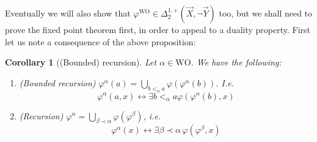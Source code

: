 \documentclass[10pt,a4paper]{amsart}
\theoremstyle{plain}
\newtheorem{corollary}[corollary]{Corollary}
\theoremstyle{definition}
\renewcommand{\phi}{\varphi}
\theoremstyle{plain}
\theoremstyle{definition} %
\newcommand{\liff}{\leftrightarrow}
\newcommand{\Din}[2]{\Delta^{#1}_{#2}}
\newcommand{\posDin}[3]{\Din{#1,+}{#2} (#3)}
\newcommand{\posnegDin}[4]{\posDin{#1}{#2}{#3, \lnot #4}}
\newcommand{\WO}{\mathrm{WO}}
\newcommand{\ordlneq}{\prec}
\begin{document}
Eventually we will also show that $\phi^\WO \in \posnegDin 1 2 {\vec X}{\vec Y}$ too, but we shall need to prove the fixed point theorem first, in order to appeal to a duality property.
First let us note a consequence of the above proposition:
\begin{corollary}
    [(Bounded) recursion]
    \label{cor:(bdd)-recursion}
   Let $\alpha \in \WO$. We have the following:
    \begin{enumerate}
        \item\label{item:bdd-recursion} (Bounded recursion) $\phi^\alpha(a) = \bigcup\limits_{b<_\alpha a} \phi(\phi^\alpha(b))$.
    I.e.\
    \[\phi^\alpha(a,x) \liff \exists b<_\alpha a \phi(\phi^\alpha(b),x)
    \]
    \item\label{item:recursion} (Recursion) $\phi^\alpha = \bigcup\limits_{\beta \ordlneq \alpha} \phi(\phi^\beta)$, i.e.\ 
    \[
    \phi^\alpha(x) \liff \exists \beta \ordlneq \alpha\, \phi(\phi^\beta, x)
    \]
    \end{enumerate}
\end{corollary}
\end{document}
